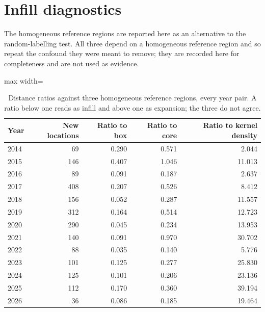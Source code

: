 \documentclass[fleqn,10pt]{wlpeerj}
\begin{document}
\section{Infill diagnostics}
\label{si:infill}

The homogeneous reference regions are reported here as an alternative to the random-labelling
test. All three depend on a homogeneous reference region and so repeat the confound they were meant to
remove; they are recorded here for completeness and are not used as evidence.

\begin{table}[H]
\centering
\caption{Distance ratios against three homogeneous reference regions, every year pair. A ratio
below one reads as infill and above one as expansion; the three do not agree.}
\label{si:infillratios}
\small
\begin{adjustbox}{max width=\linewidth}
\begin{tabular}{lrrrr}
\toprule
Year & New locations & Ratio to box & Ratio to core & Ratio to kernel density \\
\midrule
2014 & 69 & 0.290 & 0.571 & 2.044 \\
2015 & 146 & 0.407 & 1.046 & 11.013 \\
2016 & 89 & 0.091 & 0.187 & 2.637 \\
2017 & 408 & 0.207 & 0.526 & 8.412 \\
2018 & 156 & 0.052 & 0.287 & 11.557 \\
2019 & 312 & 0.164 & 0.514 & 12.723 \\
2020 & 290 & 0.045 & 0.234 & 13.953 \\
2021 & 140 & 0.091 & 0.970 & 30.702 \\
2022 & 88 & 0.035 & 0.140 & 5.776 \\
2023 & 101 & 0.125 & 0.277 & 25.830 \\
2024 & 125 & 0.101 & 0.206 & 23.136 \\
2025 & 112 & 0.170 & 0.360 & 39.194 \\
2026 & 36 & 0.086 & 0.185 & 19.464 \\
\bottomrule
\end{tabular}
\end{adjustbox}
\end{table}
\end{document}
